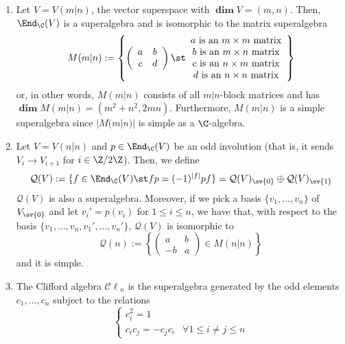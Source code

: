 \documentclass[11pt,leqno,oneside]{amsbook}
\newcommand{\grdim}{\boldsymbol{\dim}}
\renewcommand{\Q}{\mathcal{Q}}
\newcommand{\Cl}{\mathcal{C\ell}} %
\numberwithin{thm}{section}
\begin{document}
\begin{example}
  \begin{enumerate}
  \item Let \(V = V(m|n)\), the vector superspace with \(\grdim V =
    (m,n)\). Then, \(\End_\C(V)\) is a superalgebra and is isomorphic
    to the matrix superalgebra \[
      M(m|n) := \left\{ \left(
          \begin{array}{cc}
            a&b\\
            c&d
          \end{array}
\right) \st
\begin{array}{c}
  a \text{ is an }m \times m \text{ matrix}\\
  b \text{ is an }m \times n \text{ matrix}\\
  c \text{ is an }n \times m \text{ matrix}\\
  d \text{ is an }n \times n \text{ matrix}
\end{array}
\right\}
\]
or, in other words, \(M(m|n)\) consists of all \(m|n\)-block matrices
and has \(\grdim M(m|n) = (m^2+n^2, 2mn)\). Furthermore, \(M(m|n)\) is
a simple superalgebra since \(|M(m|n)|\) is simple as a \(\C\)-algebra.
\item Let \(V = V(n|n)\) and \(p \in \End_\C(V)\) be an odd involution
  (that is, it sends \(V_i \to V_{i+1}\) for \(i \in \Z/2\Z\)). Then,
  we define \[
    \Q(V) := \{f \in \End_\C(V) \st fp = (-1)^{|f|}pf\} =
    \Q(V)_{\ov{0}} \oplus \Q(V)_{\ov{1}}
  \]
  \(\Q(V)\) is also a superalgebra. Moreover, if we pick a basis
  \(\{v_1, \ldots, v_n\}\) of \(V_{\ov{0}}\) and let \(v_i' = p(v_i)\)
  for \(1 \leq i \leq n\), we have that, with respect to the basis
  \(\{v_1, \ldots, v_n, v_1', \ldots, v_n'\}\), \(\Q(V)\) is
  isomorphic to \[
    \Q(n) := \left\{ \left(
        \begin{array}{cc}
          a&b\\
          -b&a
        \end{array}
      \right) \in M(n|n) \right\}
  \]
  and it is simple.
  \item The Clifford algebra \(\Cl_n\) is the superalgebra generated
    by the odd elements \(c_1, \ldots, c_n\) subject to the
    relations \[
      \begin{cases}
        c_i^2 = 1\\
        c_i c_j = - c_j c_i & \forall 1 \leq i \neq j \leq n
      \end{cases}
    \]
  \end{enumerate}
\end{example}
\end{document}
